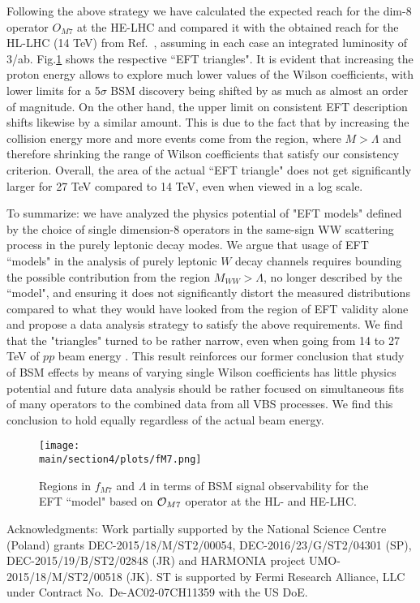 Following the above strategy we have calculated the expected reach for the dim-8 operator $O_{M7}$ at the HE-LHC and compared it with the obtained reach for the HL-LHC (14 TeV) from Ref.~\cite{Kalinowski:2018oxd}, assuming in each case an integrated luminosity of 3/ab.  Fig.\ref{fig:fM7} shows the respective ``EFT triangles".  It is evident that increasing the proton energy allows to explore much lower values of the Wilson coefficients, with lower limits for a 5$\sigma$ BSM discovery being shifted by as much as almost an order of magnitude.  On the other hand, the upper limit on consistent EFT description shifts likewise by a similar amount. This is due to the fact that by increasing the collision energy more and more events come from the region, where $M>\Lambda$ and therefore shrinking the range of Wilson coefficients that satisfy our consistency criterion.  Overall, the area of the actual ``EFT triangle" does not get significantly larger for 27 TeV compared to 14 TeV, even when viewed in a log scale.  

To summarize:  we have analyzed the physics potential of "EFT models" defined by the choice of single dimension-8 operators in the same-sign WW scattering process in the purely leptonic decay modes.  
We argue that usage of EFT ``models" in the analysis of purely
leptonic $W$ decay channels requires bounding the possible contribution from
the region $M_{WW} > \Lambda$, no longer described by the ``model",
and ensuring it does not significantly distort the measured distributions 
compared to what they would have looked from the region of EFT validity alone and 
propose a data analysis strategy to satisfy the above requirements.  
We find that the "triangles"  turned to be rather narrow, even when going from 14 to 27 TeV of $pp$ beam energy . This result reinforces our former conclusion that study of BSM effects by means of varying single Wilson coefficients has little physics potential and future data analysis should be rather focused on simultaneous fits of many operators to the combined data from all VBS processes.  We find this conclusion to hold equally regardless of the actual beam energy.




\begin{figure}
\centering
\texttt{[image: \\main/section4/plots/fM7.png]}
\caption{
Regions in $f_{M7}$ and $\Lambda$ in terms of BSM signal observability
for the EFT ``model"  based on ${\cal O}_{M7}$ operator at the HL- and HE-LHC.}
\label{fig:fM7}
\end{figure}




%
Acknowledgments: 
Work partially supported by the National Science Centre (Poland) grants
DEC-2015/18/M/ST2/00054,  DEC-2016/23/G/ST2/04301 (SP), DEC-2015/19/B/ST2/02848 (JR) and 
HARMONIA project 
UMO-2015/18/M/ST2/00518  (JK). 
ST is supported by Fermi Research Alliance, LLC under Contract No.~De-AC02-07CH11359 with the US DoE.
